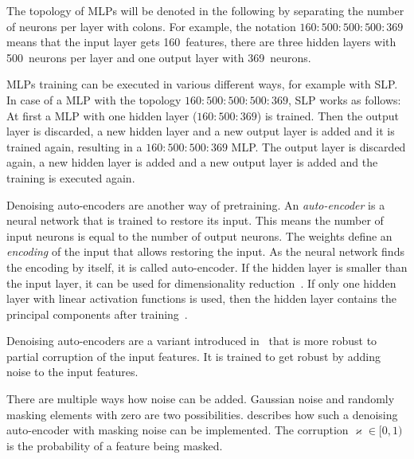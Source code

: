 The topology of \glspl{MLP} will be denoted in the following by separating the
number of neurons per layer with colons. For example, the notation
$160{:}500{:}500{:}500{:}369$ means that the input layer gets 160~features,
there are three hidden layers with 500~neurons per layer and one output layer
with 369~neurons.

\glspl{MLP} training can be executed in various different ways, for example
with \acrfull{SLP}. In case of a \gls{MLP} with the topology
$160{:}500{:}500{:}500{:}369$, \gls{SLP} works as follows: At first a \gls{MLP}
with one hidden layer ($160{:}500{:}369$) is trained. Then the output layer is
discarded, a new hidden layer and a new output layer is added and it is trained
again, resulting in a $160{:}500{:}500{:}369$ \gls{MLP}. The output layer is
discarded again, a new hidden layer is added and a new output layer is added
and the training is executed again.

Denoising auto-encoders are another way of pretraining. An
\textit{auto-encoder} is a neural network that is trained to restore its input.
This means the number of input neurons is equal to the number of output
neurons. The weights define an \textit{encoding} of the input that allows
restoring the input. As the neural network finds the encoding by itself, it is
called auto-encoder. If the hidden layer is smaller than the input layer, it
can be used for dimensionality reduction~\cite{Hinton1989}. If only one hidden
layer with linear activation functions is used, then the hidden layer contains
the principal components after training~\cite{Duda2001}.

Denoising auto-encoders are a variant introduced in~\cite{Vincent2008} that
is more robust to partial corruption of the input features. It is trained to
get robust by adding noise to the input features.

There are multiple ways how noise can be added. Gaussian noise and randomly
masking elements with zero are two possibilities.
\cite{Deeplearning-Denoising-AE} describes how such a denoising auto-encoder
with masking noise can be implemented. The corruption $\varkappa \in [0, 1)$ is
the probability of a feature being masked.